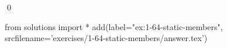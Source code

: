 
\begin{ex}
  \label{ex:1-64-static-members}
  
  \qed
\end{ex}
\begin{python0}
from solutions import *
add(label="ex:1-64-static-members",
    srcfilename='exercises/1-64-static-members/answer.tex')
\end{python0}
